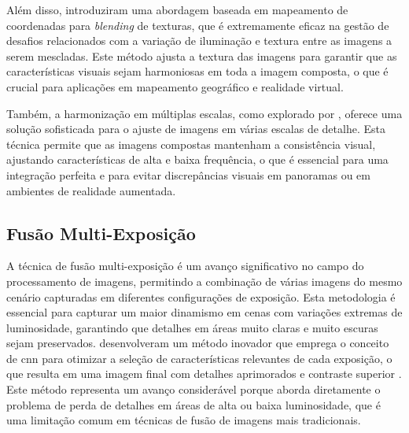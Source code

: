 Além disso,  introduziram uma abordagem baseada em mapeamento de coordenadas para \textit{blending} de texturas, que é extremamente eficaz na gestão de desafios relacionados com a variação de iluminação e textura entre as imagens a serem mescladas. Este método ajusta a textura das imagens para garantir que as características visuais sejam harmoniosas em toda a imagem composta, o que é crucial para aplicações em mapeamento geográfico e realidade virtual.

Também, a harmonização em múltiplas escalas, como explorado por , oferece uma solução sofisticada para o ajuste de imagens em várias escalas de detalhe. Esta técnica permite que as imagens compostas mantenham a consistência visual, ajustando características de alta e baixa frequência, o que é essencial para uma integração perfeita e para evitar discrepâncias visuais em panoramas ou em ambientes de realidade aumentada.


\subsection{Fusão Multi-Exposição}\label{subsec:multiexposicao}


A técnica de fusão multi-exposição é um avanço significativo no campo do processamento de imagens, permitindo a combinação de várias imagens do mesmo cenário capturadas em diferentes configurações de exposição. Esta metodologia é essencial para capturar um maior dinamismo em cenas com variações extremas de luminosidade, garantindo que detalhes em áreas muito claras e muito escuras sejam preservados.  desenvolveram um método inovador que emprega o conceito de \gls{cnn} para otimizar a seleção de características relevantes de cada exposição, o que resulta em uma imagem final com detalhes aprimorados e contraste superior \cite{zhang2020}. Este método representa um avanço considerável porque aborda diretamente o problema de perda de detalhes em áreas de alta ou baixa luminosidade, que é uma limitação comum em técnicas de fusão de imagens mais tradicionais.

